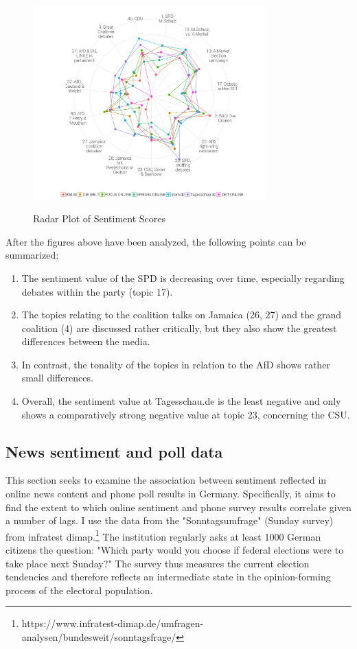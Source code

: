\documentclass[12pt,a4paper,notitlepage]{article}
\begin{document}
\begin{figure}[H]
	\caption{Radar Plot of Sentiment Scores}
	\begin{center}
			\includegraphics[width=0.8\textwidth,keepaspectratio]{figs/sentscore_radar.png}
			\label{fig_sentscore_radar}
	\end{center}
\end{figure}

After the figures above have been analyzed, the following points can be summarized:

\begin{enumerate}
	\item The sentiment value of the SPD is decreasing over time, especially regarding debates within the party (topic 17). 
	\item The topics relating to the coalition talks on Jamaica (26, 27) and the grand coalition (4) are discussed rather critically, but they also show the greatest differences between the media. 
	\item In contrast, the tonality of the topics in relation to the AfD shows rather small differences. 
	\item Overall, the sentiment value at Tagesschau.de is the least negative and only shows a comparatively strong negative value at topic 23, concerning the CSU.
\end{enumerate} 

\subsection{News sentiment and poll data}\label{ch_correlation}

This section seeks to examine the association between sentiment reflected in online news content and phone poll results in Germany. Specifically, it aims to find the extent to which online sentiment and phone survey results correlate given a number of lags. I use the data from the "Sonntagsumfrage" (Sunday survey) from infratest dimap.\footnote{https://www.infratest-dimap.de/umfragen-analysen/bundesweit/sonntagsfrage/} The institution regularly asks at least 1000 German citizens the question: "Which party would you choose if federal elections were to take place next Sunday?" The survey thus measures the current election tendencies and therefore reflects an intermediate state in the opinion-forming process of the electoral population.
\end{document}
